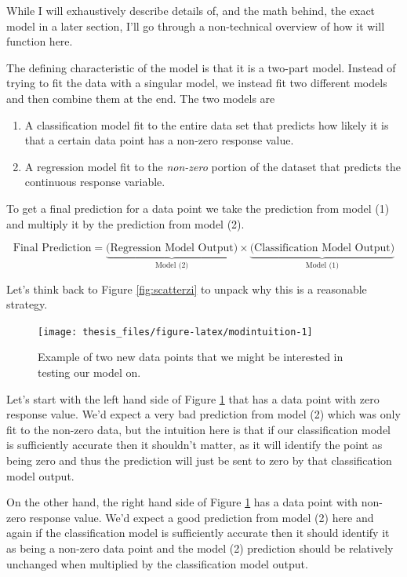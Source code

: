 \documentclass[12pt,twoside]{reedthesis}
\begin{document}
While I will exhaustively describe details of, and the math behind, the exact model in a later section, I'll go through a non-technical overview of how it will function here.

The defining characteristic of the model is that it is a two-part model. Instead of trying to fit the data with a singular model, we instead fit two different models and then combine them at the end. The two models are
\begin{enumerate}
\def\labelenumi{\arabic{enumi}.}
\item
  A classification model fit to the entire data set that predicts how likely it is that a certain data point has a non-zero response value.
\item
  A regression model fit to the \emph{non-zero} portion of the dataset that predicts the continuous response variable.
\end{enumerate}
To get a final prediction for a data point we take the prediction from model (1) and multiply it by the prediction from model (2).

\[
\text{Final Prediction} = \underbrace{\bigg(\text{Regression Model Output}\bigg)}_{\text{Model (2)}} \times \underbrace{\bigg(\text{Classification Model Output}\bigg)}_{\text{Model (1)}}
\]

Let's think back to Figure \ref{fig:scatterzi} to unpack why this is a reasonable strategy.
\begin{figure}

{\centering \texttt{[image: thesis\_files/figure-latex/modintuition-1]} 

}

\caption{Example of two new data points that we might be interested in testing our model on.}\label{fig:modintuition}
\end{figure}
Let's start with the left hand side of Figure \ref{fig:modintuition} that has a data point with zero response value. We'd expect a very bad prediction from model (2) which was only fit to the non-zero data, but the intuition here is that if our classification model is sufficiently accurate then it shouldn't matter, as it will identify the point as being zero and thus the prediction will just be sent to zero by that classification model output.

On the other hand, the right hand side of Figure \ref{fig:modintuition} has a data point with non-zero response value. We'd expect a good prediction from model (2) here and again if the classification model is sufficiently accurate then it should identify it as being a non-zero data point and the model (2) prediction should be relatively unchanged when multiplied by the classification model output.
\end{document}
